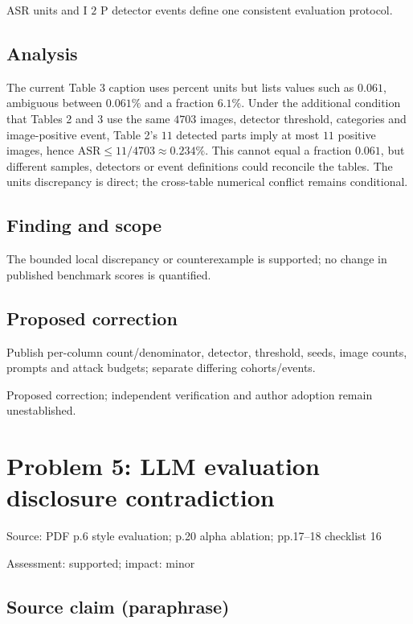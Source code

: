 \documentclass[11pt]{article}
\begin{document}
ASR units and I \(2\) P detector events define one consistent evaluation protocol.

\subsection*{Analysis}

The current Table 3 caption uses percent units but lists values such as \(0.061\), ambiguous between \(0.061\%\) and a fraction \(6.1\%\). Under the additional condition that Tables 2 and 3 use the same \(4703\) images, detector threshold, categories and image-positive event, Table 2’s \(11\) detected parts imply at most \(11\) positive images, hence \(\mathrm{ASR}\le11/4703\approx0.234\%\). This cannot equal a fraction \(0.061\), but different samples, detectors or event definitions could reconcile the tables. The units discrepancy is direct; the cross-table numerical conflict remains conditional.

\subsection*{Finding and scope}

The bounded local discrepancy or counterexample is supported; no change in published benchmark scores is quantified.

\subsection*{Proposed correction}

Publish per-column count/denominator, detector, threshold, seeds, image counts, prompts and attack budgets; separate differing cohorts/events.

Proposed correction; independent verification and author adoption remain unestablished.

\section*{Problem 5: LLM evaluation disclosure contradiction}

Source: PDF p.6 style evaluation; p.20 alpha ablation; pp.17–18 checklist 16

Assessment: supported; impact: minor

\subsection*{Source claim (paraphrase)}
\end{document}
